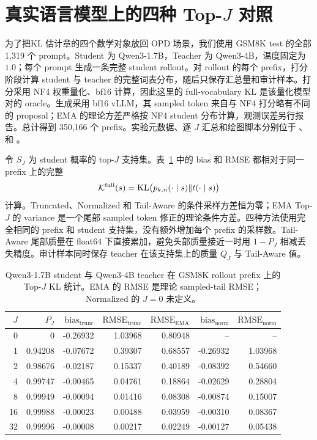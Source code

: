 \section{真实语言模型上的四种 \texorpdfstring{Top-$J$}{Top-J} 对照}

为了把KL 估计章的四个数学对象放回 OPD 场景，我们使用 GSM8K test 的全部 1,319 个 prompt。Student 为 Qwen3-1.7B，Teacher 为 Qwen3-4B，温度固定为 $1.0$；每个 prompt 生成一条完整 student rollout。对 rollout 的每个 prefix，打分阶段计算 student 与 teacher 的完整词表分布，随后只保存汇总量和审计样本。打分采用 NF4 权重量化、bf16 计算，因此这里的 full-vocabulary KL 是该量化模型对的 oracle。生成采用 bf16 vLLM，其 sampled token 来自与 NF4 打分略有不同的 proposal；EMA 的理论方差严格按 NF4 student 分布计算，观测误差另行报告。总计得到 350,166 个 prefix。实验元数据、逐 $J$ 汇总和绘图脚本分别位于 、  和 。

令 $S_J$ 为 student 概率的 top-$J$ 支持集。表~\ref{tab:qwen-topk-four} 中的 bias 和 RMSE 都相对于同一 prefix 上的完整
\begin{equation}
 \mathcal K^{\mathrm{full}}(s)=\operatorname{KL}\bigl(p_{k,n}(\cdot\mid s)\Vert t(\cdot\mid s)\bigr)
\end{equation}
计算。Truncated、Normalized 和 Tail-Aware 的条件采样方差恒为零；EMA Top-$J$ 的 variance 是一个尾部 sampled token 修正的理论条件方差。四种方法使用完全相同的 prefix 和 student 支持集，没有额外增加每个 prefix 的采样数。Tail-Aware 尾部质量在 float64 下直接累加，避免头部质量接近一时用 $1-P_J$ 相减丢失精度。审计样本同时保存 teacher 在该支持集上的质量 $Q_J$ 与 Tail-Aware 值。

\begin{table}[ht]
\centering
\small
\caption{Qwen3-1.7B student 与 Qwen3-4B teacher 在 GSM8K rollout prefix 上的 Top-$J$ KL 统计。EMA 的 RMSE 是理论 sampled-tail RMSE；Normalized 的 $J=0$ 未定义。}
\label{tab:qwen-topk-four}
\begin{tabular}{rrrrrrr}
\toprule
$J$ & $P_J$ & $\mathrm{bias}_{\mathrm{trunc}}$ & $\mathrm{RMSE}_{\mathrm{trunc}}$ & $\mathrm{RMSE}_{\mathrm{EMA}}$ & $\mathrm{bias}_{\mathrm{norm}}$ & $\mathrm{RMSE}_{\mathrm{norm}}$\\
\midrule
0  & 0       & -0.26932 & 1.03968 & 0.80948 & --       & --\\
1  & 0.94208 & -0.07672 & 0.39307 & 0.68557 & -0.26932 & 1.03968\\
2  & 0.98676 & -0.02187 & 0.15337 & 0.40189 & -0.08392 & 0.54660\\
4  & 0.99747 & -0.00465 & 0.04761 & 0.18864 & -0.02629 & 0.28804\\
8  & 0.99949 & -0.00094 & 0.01416 & 0.08308 & -0.00874 & 0.15007\\
16 & 0.99988 & -0.00023 & 0.00488 & 0.03959 & -0.00310 & 0.08367\\
32 & 0.99996 & -0.00008 & 0.00217 & 0.02249 & -0.00127 & 0.05438\\
\bottomrule
\end{tabular}
\end{table}

